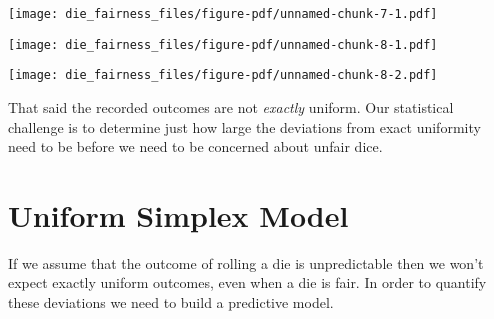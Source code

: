 \documentclass[
  letterpaper,
  DIV=11,
  numbers=noendperiod]{scrartcl}
\newenvironment{Shaded}{\begin{snugshade}}{\end{snugshade}}
\newcommand{\AttributeTok}[1]{\textcolor[rgb]{0.40,0.45,0.13}{#1}}
\newcommand{\ControlFlowTok}[1]{\textcolor[rgb]{0.00,0.23,0.31}{#1}}
\newcommand{\DecValTok}[1]{\textcolor[rgb]{0.68,0.00,0.00}{#1}}
\newcommand{\FloatTok}[1]{\textcolor[rgb]{0.68,0.00,0.00}{#1}}
\newcommand{\FunctionTok}[1]{\textcolor[rgb]{0.28,0.35,0.67}{#1}}
\newcommand{\NormalTok}[1]{\textcolor[rgb]{0.00,0.23,0.31}{#1}}
\newcommand{\SpecialCharTok}[1]{\textcolor[rgb]{0.37,0.37,0.37}{#1}}
\newcommand{\StringTok}[1]{\textcolor[rgb]{0.13,0.47,0.30}{#1}}
\begin{document}
\texttt{[image: die\_fairness\_files/figure-pdf/unnamed-chunk-7-1.pdf]}

\begin{Shaded}
\end{Shaded}

\texttt{[image: die\_fairness\_files/figure-pdf/unnamed-chunk-8-1.pdf]}

\texttt{[image: die\_fairness\_files/figure-pdf/unnamed-chunk-8-2.pdf]}

That said the recorded outcomes are not \emph{exactly} uniform. Our
statistical challenge is to determine just how large the deviations from
exact uniformity need to be before we need to be concerned about unfair
dice.

\section{Uniform Simplex Model}\label{uniform-simplex-model}

If we assume that the outcome of rolling a die is unpredictable then we
won't expect exactly uniform outcomes, even when a die is fair. In order
to quantify these deviations we need to build a predictive model.
\end{document}
